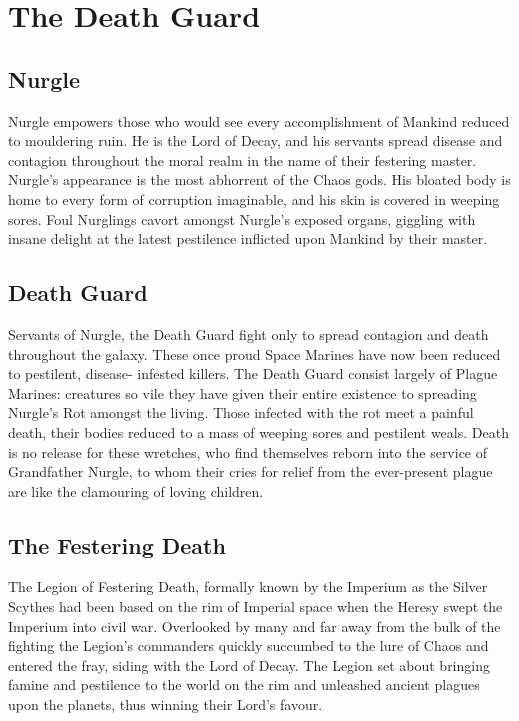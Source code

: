 \documentclass[a4paper, twocolumn]{article}
\begin{document}

\section{The Death Guard}

\subsection{Nurgle}
Nurgle empowers those who would see every accomplishment of Mankind reduced to
mouldering ruin. He is the Lord of Decay, and his servants spread
disease and contagion throughout the moral realm in the name
of their festering master. Nurgle’s appearance is the most abhorrent
of the Chaos gods. His bloated body is home to every form of corruption
imaginable, and his skin is covered in weeping sores. Foul Nurglings
cavort amongst Nurgle’s exposed organs, giggling with insane delight
at the latest pestilence inflicted upon Mankind by their master.

\subsection{Death Guard}
Servants of Nurgle, the Death Guard fight only to spread
contagion and death throughout the galaxy. These once proud
Space Marines have now been reduced to pestilent, disease-
infested killers. The Death Guard consist largely of Plague
Marines: creatures so vile they have given their entire existence
to spreading Nurgle’s Rot amongst the living. Those infected with
the rot meet a painful death, their bodies reduced to a mass of
weeping sores and pestilent weals. Death is no release for these
wretches, who find themselves reborn into the service of Grandfather
Nurgle, to whom their cries for relief from the ever-present plague
are like the clamouring of loving children.

\subsection{The Festering Death}
The Legion of Festering Death, formally known by the Imperium as the
Silver Scythes had been based on the rim of Imperial space when the
Heresy swept the Imperium into civil war. Overlooked by many and far
away from the bulk of the fighting the Legion’s commanders quickly
succumbed to the lure of Chaos and entered the fray, siding with the
Lord of Decay. The Legion set about bringing famine and
pestilence to the world on the rim and unleashed ancient plagues
upon the planets, thus winning their Lord’s favour.
\end{document}
